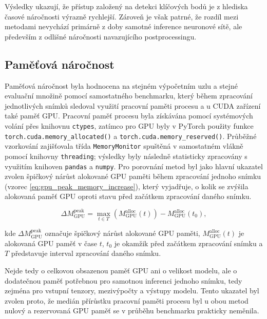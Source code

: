 \documentclass[male,czech,api_bc]{kitheses}
\begin{document}
Výsledky ukazují, že přístup založený na detekci klíčových bodů je z hlediska časové náročnosti výrazně rychlejší. Zároveň je však patrné, že rozdíl mezi metodami nevychází primárně z doby samotné inference neuronové sítě, ale především z odlišné náročnosti navazujícího postprocessingu.

\subsection{Paměťová náročnost}

Paměťová náročnost byla hodnocena na stejném výpočetním uzlu a stejné evaluační množině pomocí samostatného benchmarku, který během zpracování jednotlivých snímků sledoval využití pracovní paměti procesu a u CUDA zařízení také paměť GPU. Pracovní paměť procesu byla získávána pomocí systémových volání přes knihovnu \texttt{ctypes}, zatímco pro GPU byly v PyTorch použity funkce \texttt{torch.cuda.memory\_allocated()} a \texttt{torch.cuda.memory\_reserved()}. Průběžné vzorkování zajišťovala třída \texttt{MemoryMonitor} spuštěná v samostatném vlákně pomocí knihovny \texttt{threading}; výsledky byly následně statisticky zpracovány s využitím knihoven \texttt{pandas} a \texttt{numpy}. Pro porovnání metod byl jako hlavní ukazatel zvolen špičkový nárůst alokované GPU paměti během zpracování jednoho snímku (vzorec \ref{eq:gpu_peak_memory_increase}), který vyjadřuje, o kolik se zvýšila alokovaná paměť GPU oproti stavu před začátkem zpracování daného snímku.

\begin{equation}
\Delta M_{\mathrm{GPU}}^{\mathrm{peak}}
=
\max_{t \in T}
\left(
M_{\mathrm{GPU}}^{\mathrm{alloc}}(t)
\right)
-
M_{\mathrm{GPU}}^{\mathrm{alloc}}(t_0),
\label{eq:gpu_peak_memory_increase}
\end{equation}

kde $\Delta M_{\mathrm{GPU}}^{\mathrm{peak}}$ označuje špičkový nárůst alokované GPU paměti, $M_{\mathrm{GPU}}^{\mathrm{alloc}}(t)$ je alokovaná GPU paměť v čase $t$, $t_0$ je okamžik před začátkem zpracování snímku a $T$ představuje interval zpracování daného snímku.


Nejde tedy o celkovou obsazenou paměť GPU ani o velikost modelu, ale o dodatečnou paměť potřebnou pro samotnou inferenci jednoho snímku, tedy zejména pro vstupní tenzory, mezivýpočty a výstupy modelu. Tento ukazatel byl zvolen proto, že medián přírůstku pracovní paměti procesu byl u obou metod nulový a rezervovaná GPU paměť se v průběhu benchmarku prakticky neměnila.
\end{document}
